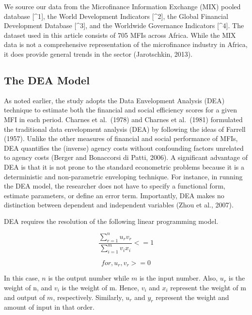 \documentclass[
]{article}
\begin{document}
We source our data from the Microfinance Information Exchange (MIX)
pooled database {[}\^{}1{]}, the World Development Indicators
{[}\^{}2{]}, the Global Financial Development Database {[}\^{}3{]}, and
the Worldwide Governance Indicators {[}\^{}4{]}. The dataset used in
this article consists of 705 MFIs across Africa. While the MIX data is
not a comprehensive representation of the microfinance industry in
Africa, it does provide general trends in the sector (Jarotschkin,
2013).

\hypertarget{the-dea-model}{%
\subsection{The DEA Model}\label{the-dea-model}}

As noted earlier, the study adopts the Data Envelopment Analysis (DEA)
technique to estimate both the financial and social efficiency scores
for a given MFI in each period. Charnes et al.~(1978) and Charnes et
al.~(1981) formulated the traditional data envelopment analysis (DEA) by
following the ideas of Farrell (1957). Unlike the other measures of
financial and social performance of MFIs, DEA quantifies the (inverse)
agency costs without confounding factors unrelated to agency costs
(Berger and Bonaccorsi di Patti, 2006). A significant advantage of DEA
is that it is not prone to the standard econometric problems because it
is a deterministic and non-parametric enveloping technique. For
instance, in running the DEA model, the researcher does not have to
specify a functional form, estimate parameters, or define an error term.
Importantly, DEA makes no distinction between dependent and independent
variables (Zhou et al., 2007).

DEA requires the resolution of the following linear programming model.

\begin{equation}

\frac{\sum_{r=1}^{n} u_{r}v_{r}}{\sum_{i=1}^{m} v_{i}x_{i}} <= 1

\end{equation}

\begin{equation}

for, u_{r}, v_{r} >= 0

\end{equation}

In this case, \(n\) is the output number while \(m\) is the input
number. Also, \(u_{r}\) is the weight of n, and \(v_{i}\) is the weight
of m. Hence, \(v_{i}\) and \(x_{i}\) represent the weight of m and
output of \(m\), respectively. Similarly, \(u_{r}\) and \(y_{r}\)
represent the weight and amount of input in that order.
\end{document}
